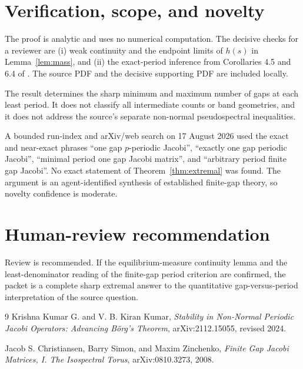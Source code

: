 \documentclass[11pt]{article}
\begin{document}
\section{Verification, scope, and novelty}

The proof is analytic and uses no numerical computation.  The decisive checks
for a reviewer are (i) weak continuity and the endpoint limits of $h(s)$ in
Lemma~\ref{lem:mass}, and (ii) the exact-period inference from Corollaries 4.5
and 6.4 of \cite{CSZ}.  The source PDF and the decisive supporting PDF are
included locally.

The result determines the sharp minimum and maximum number of gaps at each
least period.  It does not classify all intermediate counts or band
geometries, and it does not address the source's separate non-normal
pseudospectral inequalities.

A bounded run-index and arXiv/web search on 17 August 2026 used the exact and
near-exact phrases ``one gap $p$-periodic Jacobi'', ``exactly one gap periodic
Jacobi'', ``minimal period one gap Jacobi matrix'', and ``arbitrary period
finite gap Jacobi''.  No exact statement of Theorem~\ref{thm:extremal} was
found.  The argument is an agent-identified synthesis of established
finite-gap theory, so novelty confidence is moderate.

\section*{Human-review recommendation}

Review is recommended.  If the equilibrium-measure continuity lemma and the
least-denominator reading of the finite-gap period criterion are confirmed,
the packet is a complete sharp extremal answer to the quantitative
gap-versus-period interpretation of the source question.

\begin{thebibliography}{9}
Krishna Kumar G. and V. B. Kiran Kumar,
\emph{Stability in Non-Normal Periodic Jacobi Operators: Advancing B\"org's
Theorem}, arXiv:2112.15055, revised 2024.

Jacob S. Christiansen, Barry Simon, and Maxim Zinchenko,
\emph{Finite Gap Jacobi Matrices, I. The Isospectral Torus},
arXiv:0810.3273, 2008.
\end{thebibliography}
\end{document}

